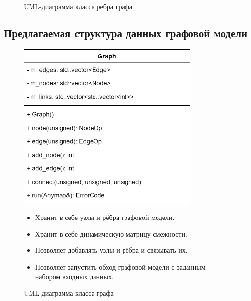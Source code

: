 \begin{frame}
\begin{figure}
\begin{minipage}{0.49\textwidth}
			\caption{UML-диаграмма класса ребра графа}
		\end{minipage}
	\end{figure}
\end{frame}

\subsection{Предлагаемая структура данных графовой модели}
\begin{frame}%
	\begin{figure}
		\begin{minipage}{0.49\textwidth}
			\centering
			\includegraphics[width=0.8\textwidth]{images/class.graph.png}
			\caption{UML-диаграмма класса графа}
		\end{minipage}\hfill\begin{minipage}{0.49\textwidth}
			\begin{itemize}
				\item Хранит в себе узлы и рёбра графовой модели.
				\item Хранит в себе динамическую матрицу смежности.
				\item Позволяет добавлять узлы и рёбра и связывать их.
				\item Позволяет запустить обход графовой модели с заданным набором входных данных.
			\end{itemize}
		\end{minipage}
	\end{figure}
\end{frame}
